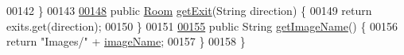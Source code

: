 \begin{DoxyCode}
00142     \}
00143 
\hypertarget{Room_8java_source_l00148}{}\hyperlink{classRoom_a384ab8c844e5775f87de24d6c470637e}{00148}     \textcolor{keyword}{public} \hyperlink{classRoom}{Room} \hyperlink{classRoom_a384ab8c844e5775f87de24d6c470637e}{getExit}(String direction) \{
00149         \textcolor{keywordflow}{return} exits.get(direction);
00150     \}
00151 
\hypertarget{Room_8java_source_l00155}{}\hyperlink{classRoom_a8177668df4d8be718812934673c42649}{00155}     \textcolor{keyword}{public} String \hyperlink{classRoom_a8177668df4d8be718812934673c42649}{getImageName}() \{
00156         \textcolor{keywordflow}{return} \textcolor{stringliteral}{"Images/"}  + \hyperlink{classRoom_a3ddf7c120b54509c43d803d2409158fc}{imageName};
00157     \}
00158 \}
\end{DoxyCode}
